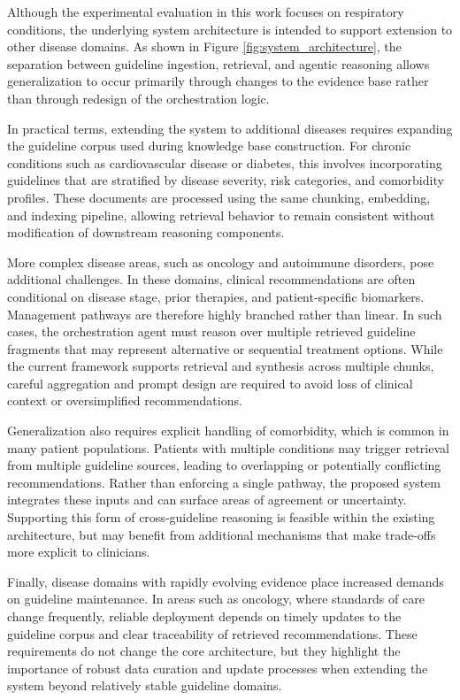\documentclass[preprint,12pt]{elsarticle}
\begin{document}
Although the experimental evaluation in this work focuses on respiratory conditions, the underlying system architecture is intended to support extension to other disease domains. As shown in Figure \ref{fig:system_architecture}, the separation between guideline ingestion, retrieval, and agentic reasoning allows generalization to occur primarily through changes to the evidence base rather than through redesign of the orchestration logic.

In practical terms, extending the system to additional diseases requires expanding the guideline corpus used during knowledge base construction. For chronic conditions such as cardiovascular disease or diabetes, this involves incorporating guidelines that are stratified by disease severity, risk categories, and comorbidity profiles. These documents are processed using the same chunking, embedding, and indexing pipeline, allowing retrieval behavior to remain consistent without modification of downstream reasoning components.

More complex disease areas, such as oncology and autoimmune disorders, pose additional challenges. In these domains, clinical recommendations are often conditional on disease stage, prior therapies, and patient-specific biomarkers. Management pathways are therefore highly branched rather than linear. In such cases, the orchestration agent must reason over multiple retrieved guideline fragments that may represent alternative or sequential treatment options. While the current framework supports retrieval and synthesis across multiple chunks, careful aggregation and prompt design are required to avoid loss of clinical context or oversimplified recommendations.

Generalization also requires explicit handling of comorbidity, which is common in many patient populations. Patients with multiple conditions may trigger retrieval from multiple guideline sources, leading to overlapping or potentially conflicting recommendations. Rather than enforcing a single pathway, the proposed system integrates these inputs and can surface areas of agreement or uncertainty. Supporting this form of cross-guideline reasoning is feasible within the existing architecture, but may benefit from additional mechanisms that make trade-offs more explicit to clinicians.

Finally, disease domains with rapidly evolving evidence place increased demands on guideline maintenance. In areas such as oncology, where standards of care change frequently, reliable deployment depends on timely updates to the guideline corpus and clear traceability of retrieved recommendations. These requirements do not change the core architecture, but they highlight the importance of robust data curation and update processes when extending the system beyond relatively stable guideline domains.
\end{document}
